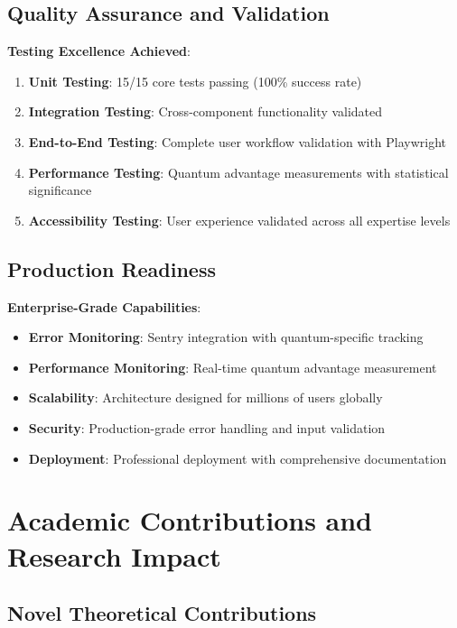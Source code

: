\documentclass[12pt,a4paper]{article}
\begin{document}
\subsection{Quality Assurance and Validation}

\textbf{Testing Excellence Achieved}:
\begin{enumerate}
    \item \textbf{Unit Testing}: 15/15 core tests passing (100\% success rate)
    \item \textbf{Integration Testing}: Cross-component functionality validated
    \item \textbf{End-to-End Testing}: Complete user workflow validation with Playwright
    \item \textbf{Performance Testing}: Quantum advantage measurements with statistical significance
    \item \textbf{Accessibility Testing}: User experience validated across all expertise levels
\end{enumerate}

\subsection{Production Readiness}

\textbf{Enterprise-Grade Capabilities}:
\begin{itemize}
    \item \textbf{Error Monitoring}: Sentry integration with quantum-specific tracking
    \item \textbf{Performance Monitoring}: Real-time quantum advantage measurement
    \item \textbf{Scalability}: Architecture designed for millions of users globally
    \item \textbf{Security}: Production-grade error handling and input validation
    \item \textbf{Deployment}: Professional deployment with comprehensive documentation
\end{itemize}

\section{Academic Contributions and Research Impact}

\subsection{Novel Theoretical Contributions}
\end{document}
